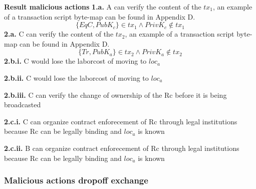 \bigbreak
\noindent\textbf{Result malicious actions}
\bigbreak
\noindent\textbf{1.a.} A can verify the content of the $tx_1$, an example of a transaction script byte-map can be found in Appendix D.
\[\{EqC, PubK_c\}\in tx_1 \land PrivK_c \notin tx_1\]
\noindent\textbf{2.a.} C can verify the content of the $tx_2$, an example of a transaction script byte-map can be found in Appendix D.
\[\{Tr, PubK_a\}\in tx_2 \land PrivK_a \notin tx_2\]
\noindent\textbf{2.b.i.} C would lose the laborcost of moving to $loc_a$ \par
\noindent\textbf{2.b.ii.} C would lose the laborcost of moving to $loc_a$ \par
\noindent\textbf{2.b.iii.} C can verify the change of ownership of the Rc before it is being broadcasted \par
\noindent\textbf{2.c.i.} C can organize contract enforecement of Rc through legal institutions because Rc can be legally binding and $loc_a$ is known \par
\noindent\textbf{2.c.ii.} B can organize contract enforecement of Rc through legal institutions because Rc can be legally binding and $loc_a$ is known \par

\subsubsection{Malicious actions dropoff exchange}

